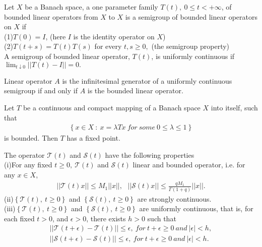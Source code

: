 \documentclass[11pt]{article}
\def \mc{\mathcal}
\begin{document}
\begin{definition}\cite{pazy}
Let $X$ be a Banach space, a one parameter family $T(t), \ 0\leq t<+\infty $, of bounded linear operators from $X$ to $X$ is a semigroup of bounded linear operators on $X$ if\\
(1)$T(0)=I$, (here $I$ is the identity operator on $X$)\\
(2)$T(t+s)=T(t)T(s)$ for every $t,s\geq 0,$ (the semigroup property)\\
A semigroup of bounded linear operator, $T(t)$, is uniformly continuous if $\displaystyle \lim_{t\downarrow 0}||T(t)-I||=0.$
\end{definition}
\begin{lemma} \cite{pazy}
Linear operator $A$ is the infinitesimal generator of a uniformly continuous semigroup if and only if $A$ is the bounded linear operator.
\end{lemma}
\begin{lemma}\cite{die,wan}
Let $T$ be a continuous and compact mapping of a Banach space $X$ into itself, such that
\begin{eqnarray*}
\left\{x\in X \ : \ x=\lambda Tx \ for \ some \ 0\leq \lambda \leq 1 \right\}
\end{eqnarray*}
is bounded. Then $T$ has a fixed point.
\end{lemma}
\begin{lemma}\cite{wan}
The operator $\mc{T} (t)$ and $\mc{S} (t)$ have the following properties\\
(i)For any fixed $t\geq 0, \ \mc{T}(t)$ and $\mc{S}(t)$ linear and bounded operator, i.e. for any $x\in X$,
\begin{eqnarray*}
||\mc{T}(t)x||\leq M_1||x||, \ \ \ ||\mc{S}(t)x||\leq \frac{qM_1}{\Gamma(1+q)}||x||.
\end{eqnarray*}
(ii)$\left\{\mc{T}(t), \ t\geq 0\right\} $ and $ \left\{\mc{S}(t), \ t\geq 0 \right\}$ are strongly continuous.\\
(iii)$\left\{\mc{T}(t), \ t\geq 0\right\} $ and $ \left\{\mc{S}(t), \ t\geq 0 \right\}$ are uniformly continuous, that is, for each fixed $t>0$, and $\epsilon >0$, there exists $h>0$ such that
\begin{eqnarray*}
||\mc{T}(t+\epsilon)-\mc{T}(t)||\leq \epsilon, \ for \ t+\epsilon \geq 0 \ and \ |\epsilon|<h,\\
||\mc{S}(t+\epsilon)-\mc{S}(t)||\leq \epsilon, \ for \ t+\epsilon \geq 0 \ and \ |\epsilon|<h.
\end{eqnarray*}
\end{lemma}
\setcounter{equation}{0}
\end{document}
